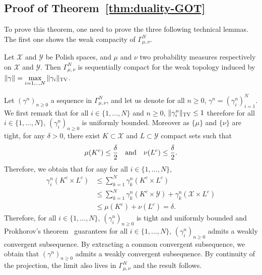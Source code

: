 \subsection{Proof of Theorem~\ref{thm:duality-GOT}}
\label{prv:duality-GOT}



To prove this theorem, one need to prove the three following technical lemmas. The first one shows the weak compacity of $\Gamma^N_{\mu,\nu}$.

\begin{lemma}
\label{lem:compact-weak}
Let $\mathcal{X}$ and $\mathcal{Y}$ be Polish spaces, and $\mu$ and $\nu$ two probability measures respectively on  $\mathcal{X}$ and $\mathcal{Y}$. Then $\Gamma^N_{\mu,\nu}$  is sequentially compact for the weak topology induced by $\Vert \gamma \Vert = \max\limits_{i=1,..,N} \Vert \gamma_i\Vert_{\textsc{TV}}$. 
\end{lemma}


\begin{prv*}
Let $(\gamma^n)_{n\geq 0}$ a sequence in $\Gamma^N_{\mu,\nu}$, and let us denote for all $n\geq 0$, $\gamma^n=(\gamma^n_i)_{i=1}^N$. We first remark that for all $i\in\{1,...,N\}$ and $n\geq 0$, $\Vert \gamma_i^n\Vert_{\textsc{TV}}\leq 1$ therefore for all $i\in\{1,...,N\}$, $(\gamma^n_i)_{n\geq 0}$ is uniformly bounded. Moreover as $\{\mu\}$ and $\{\nu\}$ are tight, for any $\delta>0$, there exist $K\subset \mathcal{X} $ and $L\subset \mathcal{Y}$ compact sets such that 
\begin{align}
    \mu(K^c)\leq \frac{\delta}{2} \text{\quad and\quad }  \nu(L^c)\leq \frac{\delta}{2}.
\end{align}
Therefore, we obtain that for any for all $i\in\{1,...,N\}$,
\begin{align}
    \gamma_i^n(K^c\times L^c)&\leq \sum_{k=1}^N \gamma_k^n(K^c\times L^c)\\
    &\leq  \sum_{k=1}^N \gamma_k^n(K^c\times\mathcal{Y})+\gamma_k^n(\mathcal{X}\times L^c)\\
    &\leq  \mu(K^c) + \nu(L^c) = \delta.
\end{align}
Therefore, for all $i\in\{1,...,N\}$,  $(\gamma_i^n)_{n\geq 0}$ is tight and uniformly bounded and Prokhorov's theorem~\citep[Theorem A.3.15]{dupuis2011weak} guarantees for all $i\in\{1,...,N\}$,  $(\gamma_i^n)_{n\geq 0}$ admits a weakly convergent subsequence. By extracting a common convergent subsequence, we obtain that $(\gamma^n)_{n\geq 0}$ admits a weakly convergent subsequence. By continuity of the projection, the limit also lives in $\Gamma
^N_{\mu,\nu}$ and the result follows.
\end{prv*}

